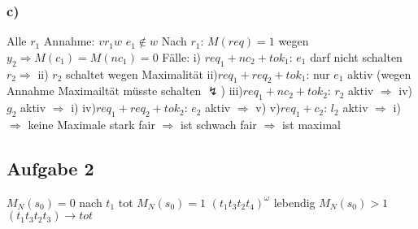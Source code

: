 \documentclass[12pt]{scrreprt}
\begin{document}
\subsubsection*{c)}
Alle $r_1$\newline
Annahme:				\tabto{2.5cm}$v r_1 w$ $e_1 \notin w$\newline
Nach $r_1$:				\tabto{2.5cm}$M(req)=1$ wegen $y_2 \Rightarrow M(c_1)=M(nc_1)=0$\newline
Fälle:	\tabto{1.5cm}i)	\tabto{2.5cm}$req_1 + nc_2 + tok_1$: $e_1$ darf nicht schalten\newline
						\tabto{2.5cm}$r_2 \Rightarrow$ ii) $r_2$ schaltet wegen Maximalität\newline
		\tabto{1.5cm}ii)\tabto{2.5cm}$req_1 + req_2 + tok_1$: nur $e_1$ aktiv\newline
						\tabto{2.5cm}(wegen Annahme Maximailtät müsste schalten $\lightning$)\newline
		\tabto{1.5cm}iii)\tabto{2.5cm}$req_1 + nc_2 + tok_2$: $r_2$ aktiv $\Rightarrow$ iv) $g_2$ aktiv $\Rightarrow$ i)\newline
		\tabto{1.5cm}iv)\tabto{2.5cm}$req_1 + req_2 + tok_2$: $e_2$ aktiv $\Rightarrow$ v)\newline
		\tabto{1.5cm}v)\tabto{2.5cm}$req_1 + c_2$: $l_2$ aktiv $\Rightarrow$ i)\newline
$\Rightarrow$ keine Maximale\newline
stark fair $\Rightarrow$ ist schwach fair $\Rightarrow$ ist maximal

\subsection*{Aufgabe 2}
$M_N(s_0)=0$ nach $t_1$ tot\newline
$M_N(s_0)=1$ $(t_1 t_3 t_2 t_4)^\omega$ lebendig\newline
$M_N(s_0)>1$ $(t_1 t_3 t_2 t_3) \rightarrow tot$\newline
\end{document}
